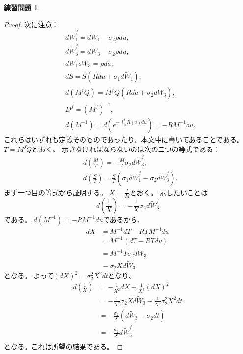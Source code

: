 \documentclass[uplatex]{jsarticle}
\theoremstyle{definition}
\newtheorem{prob}[prob]{練習問題}
\begin{document}
\begin{prob}\label{prob: 9.4}
\end{prob}

\begin{proof}
  次に注意：
  \begin{align*}
    &d\tilde{W}_1^f = d\tilde{W}_1 - \sigma_2 \rho du, \\
    &d\tilde{W}_3^f = d\tilde{W}_3 - \sigma_2 \rho du, \\
    &d\tilde{W}_1d\tilde{W}_3 = \rho du, \\
    &dS = S(Rdu + \sigma_1d\tilde{W}_1), \\
    &d\left( M^fQ \right) = M^fQ(Rdu + \sigma_2d\tilde{W}_3), \\
    &D^f = (M^f)^{-1}, \\
    &d(M^{-1}) = d\left(e^{-\int_0^tR(u)du}\right) = -RM^{-1}du.
  \end{align*}
  これらはいずれも定義そのものであったり、本文中に書いてあることである。
  \(T = M^fQ\)とおく。
  示さなければならないのは次の二つの等式である：
  \begin{align*}
    &d\left( \frac{M}{T} \right)
    = -\frac{M}{T}\sigma_2d\tilde{W}_3^f, \\
    &d\left( \frac{S}{T} \right)
    = \frac{S}{T}\left( \sigma_1d\tilde{W}_1^f - \sigma_2d\tilde{W}_3^f\right).
  \end{align*}
  まず一つ目の等式から証明する。
  \(X=\frac{T}{M}\)とおく。
  示したいことは
  \[d\left( \frac{1}{X}\right) = - \frac{1}{X}\sigma_2d\tilde{W}_3^f\]
  である。
  \(d\left( M^{-1} \right) = -RM^{-1}du\)であるから、
  \begin{align*}
    dX
    &= M^{-1}dT - RTM^{-1}du \\
    &= M^{-1}(dT - RTdu) \\
    &= M^{-1}T\sigma_2d\tilde{W}_3 \\
    &= \sigma_2Xd\tilde{W}_3
  \end{align*}
  となる。
  よって\((dX)^2 = \sigma_2^2X^2dt\)となり、
  \begin{align*}
    d\left( \frac{1}{X} \right)
    &= -\frac{1}{X^2}dX + \frac{1}{X^3}(dX)^2 \\
    &= -\frac{1}{X^2}\sigma_2Xd\tilde{W}_3
    + \frac{1}{X^3}\sigma_2^2X^2dt \\
    &= -\frac{\sigma_2}{X}\left( d\tilde{W}_3 - \sigma_2dt \right) \\
    &= -\frac{\sigma_2}{X}d\tilde{W}_3^f \\
  \end{align*}
  となる。これは所望の結果である。


\end{proof}
\end{document}
